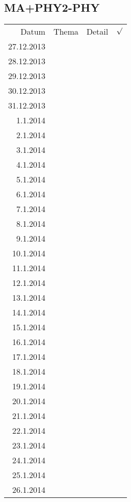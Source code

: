 \subsection{MA+PHY2-PHY}
\begin{tabular}{r l p{} l}
\rowcolor{lgray} Datum       & Thema         & Detail & $\surd$ \\
\rowcolor{white}  27.12.2013 &               &  &  \\
\rowcolor{lgray}  28.12.2013 &               &  &  \\
\rowcolor{white}  29.12.2013 &               &  &  \\
\rowcolor{lgray}  30.12.2013 &               &  &  \\
\rowcolor{white}  31.12.2013 &               &  &  \\
\rowcolor{lgray}    1.1.2014 &               &  &  \\
\rowcolor{white}    2.1.2014 &               &  &  \\
\rowcolor{lgray}    3.1.2014 &               &  &  \\
\rowcolor{white}    4.1.2014 &               &  &  \\
\rowcolor{lgray}    5.1.2014 &               &  &  \\
\rowcolor{white}    6.1.2014 &               &  &  \\
\rowcolor{lgray}    7.1.2014 &               &  &  \\
\rowcolor{white}    8.1.2014 &               &  &  \\
\rowcolor{lgray}    9.1.2014 &               &  &  \\
\rowcolor{white}   10.1.2014 &               &  &  \\
\rowcolor{lgray}   11.1.2014 &               &  &  \\
\rowcolor{white}   12.1.2014 &               &  &  \\
\rowcolor{lgray}   13.1.2014 &               &  &  \\
\rowcolor{white}   14.1.2014 &               &  &  \\
\rowcolor{lgray}   15.1.2014 &               &  &  \\
\rowcolor{white}   16.1.2014 &               &  &  \\
\rowcolor{lgray}   17.1.2014 &               &  &  \\
\rowcolor{white}   18.1.2014 &               &  &  \\
\rowcolor{lgray}   19.1.2014 &               &  &  \\
\rowcolor{white}   20.1.2014 &               &  &  \\
\rowcolor{lgray}   21.1.2014 &               &  &  \\
\rowcolor{white}   22.1.2014 &               &  &  \\
\rowcolor{lgray}   23.1.2014 &               &  &  \\
\rowcolor{white}   24.1.2014 &               &  &  \\
\rowcolor{lgray}   25.1.2014 &               &  &  \\
\rowcolor{white}   26.1.2014 &               &  &  \\
\end{tabular}

